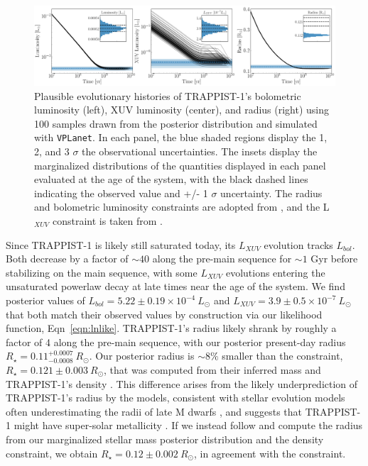 \documentclass[twocolumn]{aastex62}
\newcommand{\vplanet}[0]{\texttt{VPLanet}\xspace}
\begin{document}
\begin{figure}[t]
	\includegraphics[width=\textwidth]{../Analysis/Evol/trappist1Evol.pdf}
   \caption{Plausible evolutionary histories of TRAPPIST-1's bolometric luminosity (left), XUV luminosity (center), and radius (right) using 100 samples drawn from the posterior distribution and simulated with \vplanet. In each panel, the blue shaded regions display the 1, 2, and 3 $\sigma$ the observational uncertainties. The insets display the marginalized distributions of the quantities displayed in each panel evaluated at the age of the system, with the black dashed lines indicating the observed value and +/- 1 $\sigma$ uncertainty. The radius and bolometric luminosity constraints are adopted from \citet{vanGrootel2018}, and the L$_{XUV}$ constraint is taken from \citet{Wheatley2017}.}%
    \label{fig:evol}%
\end{figure}

Since TRAPPIST-1 is likely still saturated today, its $L_{XUV}$ evolution tracks $L_{bol}$. Both decrease by a factor of ${\sim}40$ along the pre-main sequence for ${\sim}1$ Gyr before stabilizing on the main sequence, with some $L_{XUV}$ evolutions entering the unsaturated powerlaw decay at late times near the age of the system. We find posterior values of $L_{bol} = 5.22 \pm{0.19} \times 10^{-4} \ L_{\odot}$ and $L_{XUV} = 3.9 \pm{0.5} \times 10^{-7} \ L_{\odot}$ that both match their observed values by construction via our likelihood function, Eqn~\ref{eqn:lnlike}. TRAPPIST-1's radius likely shrank by roughly a factor of 4 along the pre-main sequence, with our posterior present-day radius $R_{\star} = 0.11^{+0.0007}_{-0.0008} \ R_{\odot}$. Our posterior radius is ${\sim} 8\%$ smaller than the \citet{vanGrootel2018} constraint, $R_{\star} = 0.121 \pm {0.003} \ R_{\odot}$, that was computed from their inferred mass and TRAPPIST-1's density \citep{Delrez2018}. This difference arises from the likely underprediction of TRAPPIST-1's radius by the \citet{Baraffe2015} models, consistent with stellar evolution models often underestimating the radii of late M dwarfs \citep{Reid2005,Spada2013,Jackson2019}, and suggests that TRAPPIST-1 might have super-solar metallicity \citep{Burgasser2017,vanGrootel2018}. If we instead follow \citet{vanGrootel2018} and compute the radius from our marginalized stellar mass posterior distribution and the \citet{Delrez2018} density constraint, we obtain $R_{\star} = 0.12 \pm{0.002} \ R_{\odot}$, in agreement with the \citet{vanGrootel2018} constraint.
\end{document}
